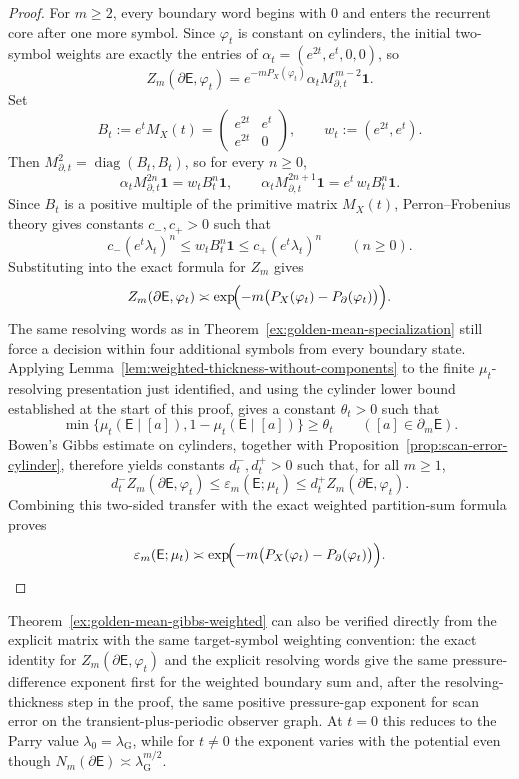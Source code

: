 \documentclass{etds}%
\numberwithin{equation}{section}
\theoremstyle{plain}
\theoremstyle{definition}
\theoremstyle{remark}
\begin{document}
\begin{proof}
For $m\ge 2$, every boundary word begins with $0$ and enters the recurrent
core after one more symbol.  Since $\varphi_t$ is constant on cylinders, the
initial two-symbol weights are exactly the entries of
$\alpha_t=(e^{2t},e^t,0,0)$, so
\[
Z_m(\partial\mathsf{E},\varphi_t)
=e^{-mP_X(\varphi_t)}\alpha_t M_{\partial,t}^{\,m-2}\mathbf{1}.
\]
Set
\[
B_t:=e^tM_X(t)
=\begin{pmatrix}
e^{2t}&e^t\\
e^{2t}&0
\end{pmatrix},
\qquad
w_t:=(e^{2t},e^t).
\]
Then $M_{\partial,t}^2=\operatorname{diag}(B_t,B_t)$, so for every $n\ge 0$,
\[
\alpha_tM_{\partial,t}^{2n}\mathbf{1}=w_tB_t^n\mathbf{1},
\qquad
\alpha_tM_{\partial,t}^{2n+1}\mathbf{1}=e^t\,w_tB_t^n\mathbf{1}.
\]
Since $B_t$ is a positive multiple of the primitive matrix $M_X(t)$,
Perron--Frobenius theory gives constants $c_-,c_+>0$ such that
\[
c_-(e^t\lambda_t)^n
\le
w_tB_t^n\mathbf{1}
\le
c_+(e^t\lambda_t)^n
\qquad(n\ge 0).
\]
Substituting into the exact formula for $Z_m$ gives
\[
Z_m(\partial\mathsf{E},\varphi_t)\asymp
\exp\!\Bigl(-m\bigl(P_X(\varphi_t)-P_\partial(\varphi_t)\bigr)\Bigr).
\]
The same resolving words as in Theorem~\ref{ex:golden-mean-specialization}
still force a decision within four additional symbols from every boundary
state.  Applying
Lemma~\ref{lem:weighted-thickness-without-components} to the finite
$\mu_t$-resolving presentation just identified, and using the cylinder lower
bound established at the start of this proof, gives a
constant $\theta_t>0$ such that
\[
\min\{\mu_t(\mathsf{E}\mid[a]),1-\mu_t(\mathsf{E}\mid[a])\}\ge \theta_t
\qquad([a]\in\partial_m\mathsf{E}).
\]
Bowen's Gibbs estimate on cylinders, together with
Proposition~\ref{prop:scan-error-cylinder}, therefore yields constants
$d_t^-,d_t^+>0$ such that, for all $m\ge 1$,
\[
d_t^- Z_m(\partial\mathsf{E},\varphi_t)
\le \varepsilon_m(\mathsf{E};\mu_t)
\le d_t^+ Z_m(\partial\mathsf{E},\varphi_t).
\]
Combining this two-sided transfer with the exact weighted partition-sum
formula proves
\[
\varepsilon_m(\mathsf{E};\mu_t)\asymp
\exp\!\Bigl(-m\bigl(P_X(\varphi_t)-P_\partial(\varphi_t)\bigr)\Bigr).
\]
\end{proof}

Theorem~\ref{ex:golden-mean-gibbs-weighted} can also be verified directly from
the explicit matrix with the same target-symbol weighting convention: the exact identity for
$Z_m(\partial\mathsf{E},\varphi_t)$ and the explicit resolving words give the
same pressure-difference exponent first for the weighted boundary sum and,
after the resolving-thickness step in the proof, the same positive
pressure-gap exponent for scan error on the
transient-plus-periodic observer graph.  At $t=0$ this reduces to the Parry value
$\lambda_0=\lambda_{\mathrm G}$, while for $t\neq 0$ the exponent varies with
the potential even though
$N_m(\partial\mathsf{E})\asymp\lambda_{\mathrm G}^{m/2}$.
\end{document}
